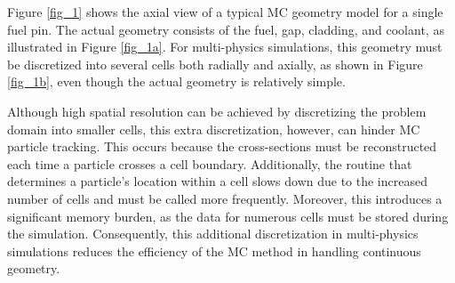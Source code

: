 Figure \ref{fig_1} shows the axial view of a typical MC geometry model for a single fuel pin. The actual geometry consists of the fuel, gap, cladding, and coolant, as illustrated in Figure \ref{fig_1a}. For multi-physics simulations, this geometry must be discretized into several cells both radially and axially, as shown in Figure \ref{fig_1b}, even though the actual geometry is relatively simple.

Although high spatial resolution can be achieved by discretizing the problem domain into smaller cells, this extra discretization, however, can hinder MC particle tracking. This occurs because the cross-sections must be reconstructed each time a particle crosses a cell boundary. Additionally, the routine that determines a particle's location within a cell slows down due to the increased number of cells and must be called more frequently. Moreover, this introduces a significant memory burden, as the data for numerous cells must be stored during the simulation. Consequently, this additional discretization in multi-physics simulations reduces the efficiency of the MC method in handling continuous geometry.

